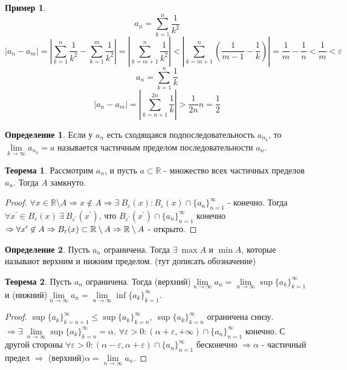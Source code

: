 \documentclass[a4paper, 12pt]{article}
\newcommand{\R}{\mathbb{R}}
\renewcommand{\epsilon}{\varepsilon}
\newcommand{\lims}{\lim\limits_{n\to \infty}}
\theoremstyle{definition}
\newtheorem*{definition}{Определение}
\newtheorem*{theorem}{Теорема}
\newtheorem*{example}{Пример}
\begin{document}
        \begin{example}
                \[a_n=\sum\limits_{k=1}^n\frac{1}{k^2}\] 
                \[|a_n-a_m|=|\sum\limits_{k=1}^n\frac{1}{k^2}-\sum\limits_{k=1}^m\frac{1}{k^2}|=|\sum\limits_{k=m+1}^n\frac{1}{k^2}|<|\sum\limits_{k=m+1}^n (\frac{1}{m-1}-\frac{1}{k})|=\frac{1}{m}-\frac{1}{n}<\frac{1}{m}<\epsilon\]
                \[a_n=\sum\limits_{k=1}^n\frac{1}{k}\]
                \[|a_n-a_m|=|\sum\limits_{k=n+1}^{2n}\frac{1}{k}|>\frac{1}{2n}n=\frac{1}{2}\]
        \end{example}
        \begin{definition}
            Если у $a_n$ есть сходящаяся подпоследовательность $a_{n_k}$, то\\ $\lim\limits_{k\to \infty}a_{n_k}=a$ называется частичным пределом последовательности $a_n$.
        \end{definition} 
        \begin{theorem}
            Рассмотрим $a_n$, и пусть $a\subset \R$ - множество всех частичных пределов $a_n$. Тогда $A$ замкнуто.
        \end{theorem} 
        \begin{proof}
            $\forall x\in \R\setminus A \Rightarrow x\not\in A \Rightarrow \exists\ B_{\epsilon}(x): B_{\epsilon}(x)\cap\{a_n\}_{n=1}^{\infty}$ - конечно. Тогда $\forall x^{\prime}\in B_{\epsilon}(x)\ \exists\ B_{\epsilon^{\prime}}(x^{\prime})$, что $B_{\epsilon^{\prime}}(x^{\prime})\cap\{a_n\}_{n=1}^{\infty}$ конечно $\Rightarrow \forall x^{\prime} \not\in A\\ \Rightarrow B_{\epsilon}(x)\subset \R\setminus A\Rightarrow \R\setminus A$ - открыто.
        \end{proof} 
        \begin{definition}
            Пусть $a_n$ ограничена. Тогда $\exists\ \max A$ и $\min A$, которые называют верхним и нижним пределом. (тут дописать обозначение)
        \end{definition} 
        \begin{theorem}
            Пусть  $a_n$ ограничена. Тогда (верхний)$\lims a_n=\lims \sup\{a_k\}_{k=1}^{\infty}$ и (нижний)$\lims a_n=\lims \inf\{a_k\}_{k=1}^{\infty}$.
        \end{theorem} 
        \begin{proof}
            $\sup \{a_k\}_{k=n+1}^{\infty} \leq \sup \{a_k\}_{k=n}^{\infty},\ \sup\{a_k\}_{k=n}^{\infty}$ ограничена снизу. $\Rightarrow \exists\ \lims \sup\{a_k\}_{k=n}^{\infty}=\alpha$. $\forall \epsilon>0: (\alpha+\epsilon,+\infty)\cap \{a_n\}_{n=1}^{\infty}$ конечно. С другой стороны $\forall \epsilon>0: (\alpha-\epsilon, \alpha+\epsilon)\cap \{a_n\}_{n=1}^{\infty}$ бесконечно $\Rightarrow \alpha$ - частичный предел $\Rightarrow$ (верхний)$\alpha=\lims a_n$.
        \end{proof} 
\end{document}
